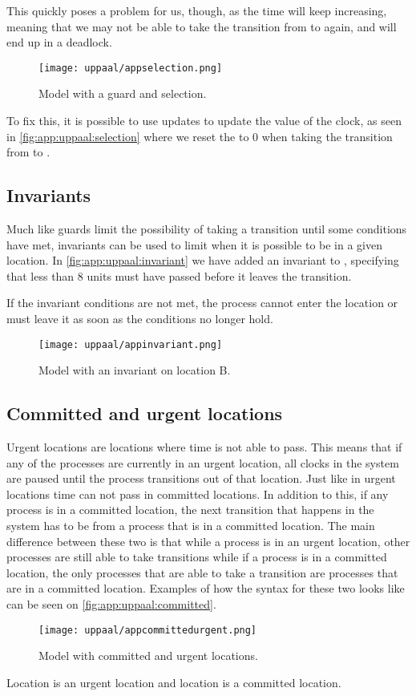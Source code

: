 This quickly poses a problem for us, though, as the time will keep increasing, meaning that we may not be able to take the transition from  to  again, and will end up in a deadlock.

\begin{figure}[H]
    \centering
    \texttt{[image: uppaal/appselection.png]}
    \caption{Model with a guard and selection.}
    \label{fig:app:uppaal:selection}
\end{figure}

To fix this, it is possible to use updates to update the value of the clock, as seen in \autoref{fig:app:uppaal:selection} where we reset the  to 0 when taking the transition from  to .

\subsection{Invariants}
Much like guards limit the possibility of taking a transition until some conditions have met, invariants can be used to limit when it is possible to be in a given location.
In \autoref{fig:app:uppaal:invariant} we have added an invariant to , specifying that less than 8  units must have passed before it leaves the transition.

If the invariant conditions are not met, the process cannot enter the location or must leave it as soon as the conditions no longer hold.
\begin{figure}[H]
    \centering
    \texttt{[image: uppaal/appinvariant.png]}
    \caption{Model with an invariant on location B.}
    \label{fig:app:uppaal:invariant}
\end{figure}

\subsection{Committed and urgent locations}
Urgent locations are locations where time is not able to pass. This means that if any of the processes are currently in an urgent location, all clocks in the system are paused until the process transitions out of that location.
Just like in urgent locations time can not pass in committed locations. In addition to this, if any process is in a committed location, the next transition that happens in the system has to be from a process that is in a committed location. 
The main difference between these two is that while a process is in an urgent location, other processes are still able to take transitions while if a process is in a committed location, the only processes that are able to take a transition are processes that are in a committed location.
Examples of how the syntax for these two looks like can be seen on \autoref{fig:app:uppaal:committed}.

\begin{figure}[H]
    \centering
    \texttt{[image: uppaal/appcommittedurgent.png]}
    \caption{Model with committed and urgent locations.}
    \label{fig:app:uppaal:committed}
\end{figure}

Location  is an urgent location and location  is a committed location.